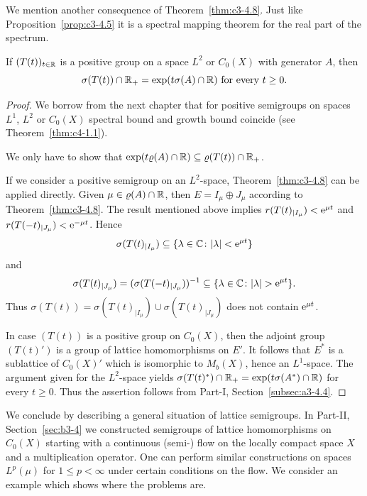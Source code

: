 We mention another consequence of Theorem~\ref{thm:c3-4.8}. Just like Proposition~\ref{prop:c3-4.5} it is a
spectral mapping theorem for the real part of the spectrum.
\begin{corollary}\label{cor:c3-4.10}
If\/ $(T(t))_{t \in \mathbb{R} }$ is a positive group on a space $L^2$ or
$C_0(X)$ with generator $A$, then
\begin{equation}\label{eq:c3-4.11}
	\sigma(T(t)) \cap \R _+ = \exp(t\sigma(A) \cap \R ) \  \text{for every} \  t \geq 0 .
\end{equation}
\end{corollary}
\begin{proof} 
We borrow from the next chapter that for positive semigroups on
spaces $L^1$, $L^2$ or $C_0(X)$ spectral bound%
and growth bound%
coincide (see Theorem~\ref{thm:c4-1.1}).

We only have to show that $\exp(t\rho(A) \cap \R ) \subseteq \rho(T(t)) \cap \R _+$.

If we consider a positive semigroup on an $L^2$-space, Theorem~\ref{thm:c3-4.8} can be
applied directly. Given $\mu \in \rho(A) \cap \R $, then $E = I_{\mu} \oplus J_{\mu}$ according to
Theorem~\ref{thm:c3-4.8}. 
The result mentioned above implies 
$r(T(t)_{|I_{\mu}}) < \mathrm{e}^{\mu t}$ and
$r(T(-t)_{|J_{\mu}}) < \mathrm{e}^{-\mu t}$. 
Hence 
%
\[
	\sigma(T(t)_{|I_{\mu}}) \subseteq \{\lambda \in \mathbb{C}  \colon |\lambda| < \mathrm{e}^{\mu t}\}
\]
and
\[
	\sigma(T(t)_{|J_{\mu}}) = (\sigma(T(-t)_{|J_{\mu}}))^{-1} 
		\subseteq \{\lambda \in \mathbb{C}  \colon |\lambda| > \mathrm{e}^{\mu t}\}.
\]
%
Thus $\sigma(T(t)) = \sigma(T(t)_{|I_{\mu}}) \cup \sigma(T(t)_{|J_{\mu}})$ does not contain $\mathrm{e}^{\mu t}$.

In case $(T(t))$ is a positive group on $C_0(X)$, then the adjoint
group $(T(t)')$ is a group of lattice homomorphisms on $E'$. It
follows that $E^*$ is a sublattice of\/ $C_0(X)'$ which is isomorphic to $M_b(X)$, hence an
$L^1$-space. 
The argument given for the $L^2$-space yields
$\sigma(T(t)^*) \cap \mathbb{R} _+ = \exp(t\sigma(A^*) \cap \mathbb{R} )$ for every $t \geq 0$. 
Thus the assertion follows from Part-I, Section~\ref{subsec:a3-4.4}.
\end{proof}
We conclude by describing a general situation of lattice semigroups. 
In Part-II, Section~\ref{sec:b3-4} we constructed semigroups of lattice
homomorphisms on $C_0(X)$ starting with a continuous (semi-) flow on the
locally compact space $X$ and a multiplication operator. 
One can perform similar constructions on spaces $L^p(\mu)$ for $1 \leq p < \infty$ under
certain conditions on the flow. 
We consider an example which shows where the problems are.

